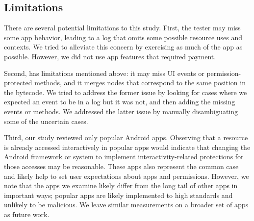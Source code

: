 


\subsection{Limitations}

There are several potential limitations to this study. First, the tester
may miss some app behavior, leading to a log that omits
some possible resource uses and contexts. We tried to alleviate
this concern by exercising as much of the app as possible. However, we
did not use app features that required payment.

Second, \apptracer{} has limitations mentioned above: it may miss UI
events or permission-protected methods, and it merges nodes that
correspond to the same position in the bytecode. We tried to address
the former issue by looking for cases where we expected an event to be
in a log but it was not, and then adding the missing events or
methods. We addressed the latter issue by manually disambiguating some
of the uncertain cases.


Third, our study reviewed only popular Android apps. Observing that a 
resource is already accessed interactively in 
popular apps would indicate that changing the Android framework 
or system to implement interactivity-related protections for those 
accesses may be reasonable. These apps also represent the 
common case and likely help to set user expectations about apps 
and permissions. However, we note that the apps we 
examine likely differ from the long tail of other apps in important ways; 
popular apps are likely implemented to high standards and unlikely to be 
malicious. We leave similar measurements 
on a broader set of apps as future work.

